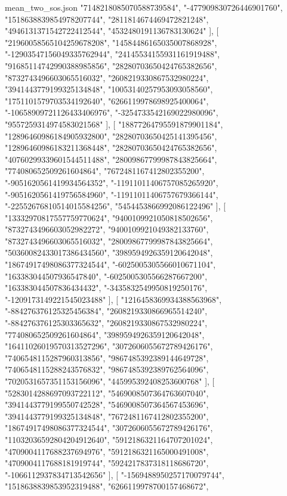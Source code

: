 \begin{filecontents*}[overwrite]{mean_two_sos.json}
    "7148218085070588739584",
    "-477909830726446901760",
    "1518638839854978207744",
    "2811814674469472821248",
    "4946131371542722412544",
    "4532480191136783130624"
   ],
   [
    "21960058565104259678208",
    "14584486165035007868928",
    "-12903547156049335762944",
    "24145534155931161919488",
    "91685114742990388985856",
    "28280703650424765382656",
    "8732743496603065516032",
    "2608219330867532980224",
    "3941443779199325134848",
    "10053140257953093058560",
    "1751101579703534192640",
    "6266119978698925400064",
    "-10658909721126433406976",
    "-3254733542169022980096",
    "9557259314974583021568"
   ],
   [
    "18877264795591879901184",
    "12896460986184905932800",
    "28280703650425141395456",
    "12896460986183211368448",
    "28280703650424765382656",
    "40760299339601544511488",
    "28009867799987843825664",
    "774080652509261604864",
    "7672481167412802355200",
    "-9051620561419934564352",
    "-11911011406757085265920",
    "-9051620561419756584960",
    "-11911011406757679366144",
    "-22552676810514015584256",
    "5454453866992086122496"
   ],
   [
    "13332970817557759770624",
    "9400109921050818502656",
    "8732743496603052982272",
    "9400109921049382133760",
    "8732743496603065516032",
    "28009867799987843825664",
    "50360082433017386434560",
    "3989594926359120642048",
    "18674917498086377324544",
    "-6025005305566010671104",
    "163383044507936547840",
    "-6025005305566287667200",
    "163383044507836434432",
    "-3435832549950819250176",
    "-1209173149221545023488"
   ],
   [
    "1216458369934388563968",
    "-884276376125325456384",
    "2608219330866965514240",
    "-884276376125303365632",
    "2608219330867532980224",
    "774080652509261604864",
    "3989594926359120642048",
    "16411026019570313527296",
    "3072606055672789426176",
    "7406548115287960313856",
    "9867485392389144649728",
    "7406548115288243576832",
    "9867485392389762564096",
    "7020531657351153156096",
    "445995392408253600768"
   ],
   [
    "5283014288697093722112",
    "5469008507364763607040",
    "3941443779199550742528",
    "5469008507364567453696",
    "3941443779199325134848",
    "7672481167412802355200",
    "18674917498086377324544",
    "3072606055672789426176",
    "11032036592804204912640",
    "5912186321164707201024",
    "4709004117688237694976",
    "5912186321165000491008",
    "4709004117688181919744",
    "5924217837318118686720",
    "-1066112937834713542656"
   ],
   [
    "-1569488950257170079744",
    "1518638839853952319488",
    "6266119978700157468672",

\end{filecontents*}
